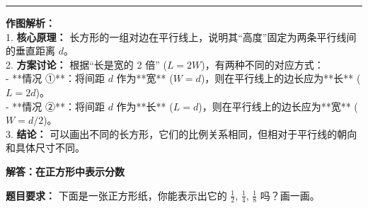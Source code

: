 \documentclass[12pt, a4paper]{ctexart}
\begin{document}
\vspace{1.0cm}
\hrule
\vspace{0.4cm}

{\small
\textbf{作图解析：} \\
1. \textbf{核心原理：} 长方形的一组对边在平行线上，说明其“高度”固定为两条平行线间的垂直距离 $d$。 \\
2. \textbf{方案讨论：} 根据“长是宽的 2 倍” ($L = 2W$)，有两种不同的对应方式： \\
   - **情况 ①**：将间距 $d$ 作为**宽** ($W=d$)，则在平行线上的边长应为**长** ($L=2d$)。 \\
   - **情况 ②**：将间距 $d$ 作为**长** ($L=d$)，则在平行线上的边长应为**宽** ($W=d/2$)。 \\
3. \textbf{结论：} 可以画出不同的长方形，它们的比例关系相同，但相对于平行线的朝向和具体尺寸不同。
}


\newpage

\begin{center}
  {\large\bfseries 解答：在正方形中表示分数}
\end{center}

\vspace{0.6cm}

\noindent
{\small \textbf{题目要求：} 下面是一张正方形纸，你能表示出它的 $\frac{1}{2}$, $\frac{1}{4}$, $\frac{1}{8}$ 吗？画一画。}

\vspace{1.0cm}
\end{document}
